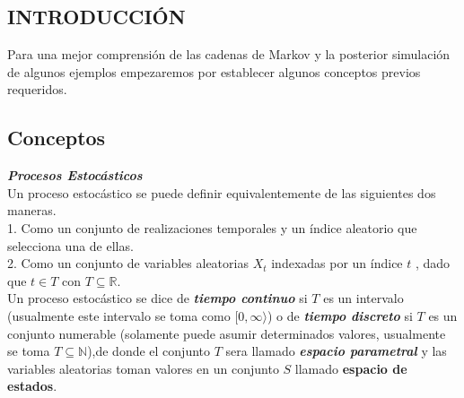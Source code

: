 \documentclass[10pt,a4paper]{article}
\theoremstyle{definition}
\theoremstyle{remark}
\begin{document}
\begin{multicols}{2}
\section{INTRODUCCIÓN}
Para una mejor comprensión de las cadenas de Markov y la posterior simulación de algunos ejemplos empezaremos por establecer algunos conceptos previos requeridos.
\subsection{Conceptos}
\textbf{\textit{Procesos Estocásticos}}\\
Un proceso estocástico se puede definir equivalentemente de las siguientes dos maneras.\\
1. Como un conjunto de realizaciones temporales y un índice aleatorio que selecciona una 
de ellas.\\
2. Como un conjunto de variables aleatorias $X_{t}$ indexadas por un índice $t$ , dado que $t \in T$ con $T\subseteq \mathbb{R} $.\\
Un proceso estocástico se dice de \textbf{\textit{tiempo continuo}} si $T$ es un intervalo (usualmente este intervalo se toma como $[0,\infty\rangle$) o de \textbf{\textit{tiempo discreto}} si $T$ es un conjunto numerable (solamente puede asumir determinados valores, usualmente se toma $T 
\subseteq \mathbb{N}$),de donde el conjunto $T$ sera llamado \textbf{\textit{espacio 
parametral}} y las variables aleatorias toman valores en un conjunto $S$ llamado 
\textbf{espacio de estados}.\\


\end{multicols}
\end{document}

